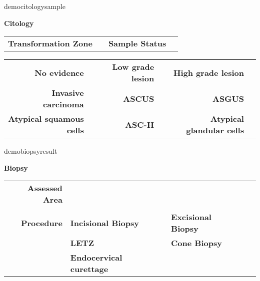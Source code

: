 \documentclass[6pt,letterpaper,spanish]{article}
\newcommand{\checkfor}[2]{%
  \ifcsname#1\endcsname%
    #2
  \else%
  \fi%
}
\begin{document}
\checkfor{democitologysample}{%
\begin{minipage}{\textwidth}
\vspace*{0.1cm}
\noindent\makebox[\linewidth]{\rule{\textwidth}{0.1pt}}
\begin{center}
\begin{Large}
\textbf{Citology}
\end{Large}
\end{center}
\vspace*{-0.5cm}
\noindent\makebox[\linewidth]{\rule{\textwidth}{0.1pt}}
\vspace*{-0.5cm}
\begin{center}
\begin{tabular}{rlrl}
\textbf{Transformation Zone} & \democitologytransformationzone &
\textbf{Sample Status} & \democitologysample\\
\end{tabular}

\bigskip
\begin{tabular}{rlrlrl}
\textbf{No evidence} & \democitologynoevidence & 
\textbf{Low grade lesion} & \democitologylowGrade & 
\textbf{High grade lesion} & \democitologyhighGrade\\
\textbf{Invasive carcinoma} & \democitologycarcinoma & 
\textbf{ASCUS} & \democitologyascus & 
\textbf{ASGUS} & \democitologyasgus\\
\textbf{Atypical squamous cells} & \democitologysquamous & 
\textbf{ASC-H} & \democitologyasch & 
\textbf{Atypical glandular cells} & \democitologyglandular\\
\end{tabular}
\end{center}
\end{minipage}
\vspace*{-0.5cm}
}

\bigskip
\checkfor{demobiopsyresult}{
	\noindent\makebox[\linewidth]{\rule{\textwidth}{0.1pt}}
	\begin{center}
	\begin{Large}
	\textbf{Biopsy}
	\end{Large}
	\end{center}
	\vspace*{-0.3cm}
	\noindent\makebox[\linewidth]{\rule{\textwidth}{0.1pt}}

\begin{center}
\begin{tabular}{rlllll}
\textbf{Assessed Area} & \demobiopsyangle\\
\\
\textbf{Procedure} & 
\textbf{Incisional Biopsy} & \demobiopsyincisional &
\textbf{Excisional Biopsy} & \demobiopsyexcisional\\
& \textbf{LETZ} & \demobiopsyletz &
\textbf{Cone Biopsy} & \demobiopsycone\\
& \textbf{Endocervical curettage} & \demobiopsyendocervical\\
\end{tabular}
}
\end{center}
\end{document}
